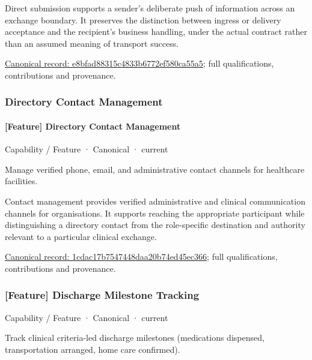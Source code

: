 Direct submission supports a sender's deliberate push of information across an exchange boundary. It preserves the distinction between ingress or delivery acceptance and the recipient's business handling, under the actual contract rather than an assumed meaning of transport success.


{\footnotesize \href{../../../../continuum/strategy/capability/feature/e8bfad88315c4833b6772ef580ca55a5.md}{Canonical record: e8bfad88315c4833b6772ef580ca55a5}; full qualifications, contributions and provenance.}\par
\subsubsection{Directory Contact Management}

\paragraph{[Feature] Directory Contact Management}

\label{element:1cdac17b7547448daa20b74ed45ec366}
{\small Capability / Feature · Canonical · current}\par

Manage verified phone, email, and administrative contact channels for healthcare facilities.



Contact management provides verified administrative and clinical communication channels for organisations. It supports reaching the appropriate participant while distinguishing a directory contact from the role-specific destination and authority relevant to a particular clinical exchange.


{\footnotesize \href{../../../../continuum/strategy/capability/feature/1cdac17b7547448daa20b74ed45ec366.md}{Canonical record: 1cdac17b7547448daa20b74ed45ec366}; full qualifications, contributions and provenance.}\par
\subsubsection{[Feature] Discharge Milestone Tracking}

\label{element:887eec1336934b13a3f21a8e3eb5f131}
{\small Capability / Feature · Canonical · current}\par

Track clinical criteria-led discharge milestones (medications dispensed, transportation arranged, home care confirmed).



